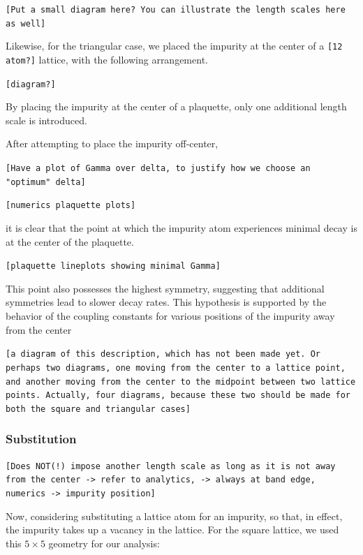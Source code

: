 \documentclass[aps,pra,superscriptaddress,twocolumn]{revtex4-1}
\newcommand{\commentSB}[1]{\texttt{\color{blue}[#1]}}
\newcommand{\commentSO}[1]{\texttt{\color{orange}[#1]}}
\newcommand{\commentTP}[1]{\texttt{\color{green}[#1]}}
\begin{document}
\commentSB{Put a small diagram here? You can illustrate the length scales here as well}

Likewise, for the triangular case, we placed the impurity at the center of a \commentSB{12 atom?} lattice, with the following arrangement. 

\commentSB{diagram?}

By placing the impurity at the center of a plaquette, only one additional length scale is introduced. 



After attempting to place the impurity off-center, 

\commentTP{Have a plot of Gamma over delta, to justify how we choose an "optimum" delta}

\commentSB{numerics plaquette plots}

it is clear that the point at which the impurity atom experiences minimal decay is at the center of the plaquette. 

\commentSB{plaquette lineplots showing minimal Gamma}

This point also possesses the highest symmetry, suggesting that additional symmetries lead to slower decay rates. This hypothesis is supported by the behavior of the coupling constants for various positions of the impurity away from the center 

\commentSB{a diagram of this description, which has not been made yet. Or perhaps two diagrams, one moving from the center to a lattice point, and another moving from the center to the midpoint between two lattice points. Actually, four diagrams, because these two should be made for both the square and triangular cases}


\subsubsection{Substitution}
\commentSO{Does NOT(!) impose another length scale as long as it is not away from the center -> refer to analytics, -> always at band edge, numerics -> impurity position}

Now, considering substituting a lattice atom for an impurity, so that, in effect, the impurity takes up a vacancy in the lattice. For the square lattice, we used this $5 \times 5$ geometry for our analysis:
\end{document}
